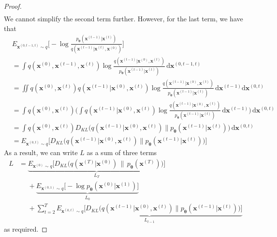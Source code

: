 \documentclass[10pt]{article}
\newcommand{\dee}{\mathrm{d}}
\newcommand{\ve}[1]{\mathbf{#1}}
\newcommand{\ves}[1]{\boldsymbol{#1}}
\begin{document}
\begin{itemize}
\begin{proof}
\begin{align*}
\end{align*}
We cannot simplify the second term further. However, for the last term, we have that
\begin{align*}
  &E_{\ve{x}^{(0,t-1,t)} \sim q} \bigg[ - \log \frac{p_{\ves{\theta}}(\ve{x}^{(t-1)}|\ve{x}^{(t)})}{q(\ve{x}^{(t-1)}|\ve{x}^{(t)},\ve{x}^{(0)})} \bigg] \\
  &= \int q(\ve{x}^{(0)},\ve{x}^{(t-1)},\ve{x}^{(t)}) \log \frac{q(\ve{x}^{(t-1)}|\ve{x}^{(0)},\ve{x}^{(t)})}{p_{\ves{\theta} }(\ve{x}^{(t-1)}|\ve{x}^{(t)})}\, \dee\ve{x}^{(0,t-1,t)} \\
  &= \iint q(\ve{x}^{(0)},\ve{x}^{(t)})q(\ve{x}^{(t-1)}|\ve{x}^{(0)},\ve{x}^{(t)}) \log \frac{q(\ve{x}^{(t-1)}|\ve{x}^{(0)},\ve{x}^{(t)})}{p_{\ves{\theta}}(\ve{x}^{(t-1)}|\ve{x}^{(t)})}\, \dee\ve{x}^{(t-1)}\dee\ve{x}^{(0,t)} \\
  &= \int q(\ve{x}^{(0)},\ve{x}^{(t)}) \bigg( \int q(\ve{x}^{(t-1)}|\ve{x}^{(0)},\ve{x}^{(t)}) \log \frac{q(\ve{x}^{(t-1)}|\ve{x}^{(0)},\ve{x}^{(t)})}{p_{\ves{\theta}}(\ve{x}^{(t-1)}|\ve{x}^{(t)})}\, \dee\ve{x}^{(t-1)}\bigg)\, \dee\ve{x}^{(0,t)} \\
  &= \int q(\ve{x}^{(0)},\ve{x}^{(t)}) D_{KL}\big( q(\ve{x}^{(t-1)}|\ve{x}^{(0)},\ve{x}^{(t)})  \big\| p_{\ves{\theta}}(\ve{x}^{(t-1)}|\ve{x}^{(t)}) \big)\, \dee\ve{x}^{(0,t)} \\
  &= E_{\ve{x}^{(0,t)}\sim q} \Big[ D_{KL}\big( q(\ve{x}^{(t-1)}|\ve{x}^{(0)},\ve{x}^{(t)})  \big\| p_{\ves{\theta}}(\ve{x}^{(t-1)}|\ve{x}^{(t)}) \big) \Big]
\end{align*}
As a result, we can write $L$ as a sum of three terms
\begin{align*}
  L
  &= \underbrace{E_{\ve{x}^{(0)} \sim q} \Big[ D_{KL}\big(q(\ve{x}^{(T)}|\ve{x}^{(0)})\, \big\|\, p_{\ves{\theta}}(\ve{x}^{(T)})\big) \Big]}_{L_T} \\
  &\phantom{=} + \underbrace{E_{\ve{x}^{(0,1)} \sim q} \bigg[ - \log p_{\ves{\theta}}(\ve{x}^{(0)}|\ve{x}^{(1)}) \bigg] }_{L_0} \\
  &\phantom{=} + \sum_{t = 2}^T \underbrace{E_{\ve{x}^{(0,t)}\sim q} \Big[ D_{KL}\big( q(\ve{x}^{(t-1)}|\ve{x}^{(0)},\ve{x}^{(t)})  \big\| p_{\ves{\theta}}(\ve{x}^{(t-1)}|\ve{x}^{(t)}) \big) \Big]}_{L_{t-1}}
\end{align*}
as required.
\end{proof} 


\end{itemize}
\end{document}
